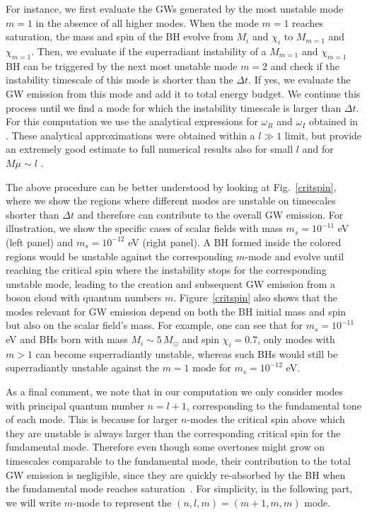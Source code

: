 \documentclass[
reprint,           %
superscriptaddress,%
amsmath,           %
amssymb,           %
aps,               %
prd,               %
notitlepage,       %
floatfix,          %
nofootinbib %
]{revtex4-1}
\begin{document}
For instance, we first evaluate the GWs generated by the most unstable mode $m=1$ in the absence of all higher modes. When the mode $m=1$ reaches saturation, the mass and spin of the BH evolve from $M_i$ and $\chi_i$ to $M_{m=1}$ and $\chi_{m=1}$. Then, we evaluate if the superradiant instability of a $M_{m=1}$ and $\chi_{m=1}$ BH can be triggered by the next most unstable mode $m=2$ and check if the instability timescale of this mode is shorter than the $\Delta t$. If yes, we evaluate the GW emission from this mode and add it to total energy budget. We continue this process until we find a mode for which the instability timescale is larger than $\Delta t$. 
%
For this computation we use the analytical expressions for $\omega_R$ and $\omega_I$ obtained in \cite{Eperon:2019viw}. These analytical approximations were obtained within a $l \gg 1$ limit, but provide an extremely good estimate to full numerical results also for small $l$ and for $M\mu \sim l$ \cite{Eperon:2019viw}. 

The above procedure can be better understood by looking at Fig.~\ref{critspin}, where we show the regions where different modes are unstable on timescales shorter than $\Delta t$ and therefore can contribute to the overall GW emission. For illustration, we show the specific cases of scalar fields with mass $m_s=10^{-11}$ eV (left panel) and  $m_s=10^{-12}$ eV (right panel). A BH formed inside the colored regions would be unstable against the corresponding $m$-mode and evolve until reaching the critical spin where the instability stops for the corresponding unstable mode, leading to the creation and subsequent GW emission from a boson cloud with quantum numbers $m$. Figure~\ref{critspin} also shows that the modes relevant for GW emission depend on both the BH initial mass and spin but also on the scalar field's mass. For example, one can see that for $m_s=10^{-11}$ eV and BHs born with mass $M_i\sim  5\, M_{\odot}$ and spin $\chi_i=0.7$, only modes with $m>1$ can become superradiantly unstable, whereas such BHs would still be superradiantly unstable against the $m=1$ mode for $m_s=10^{-12}$ eV.

As a final comment, we note that in our computation we only consider modes with principal quantum number $n=l+1$, corresponding to the fundamental tone of each mode. This is because for larger $n$-modes the critical spin above which they are unstable is always larger than the corresponding critical spin for the fundamental mode. Therefore even though some overtones might grow on timescales comparable to the fundamental mode, their contribution to the total GW emission is negligible, since they are quickly re-absorbed by the BH when the fundamental mode reaches saturation~\cite{Siemonsen:2019ebd}. For simplicity, in the following part, we will write $m$-mode to represent the $(n,l,m)=(m+1,m,m)$ mode.
\end{document}
